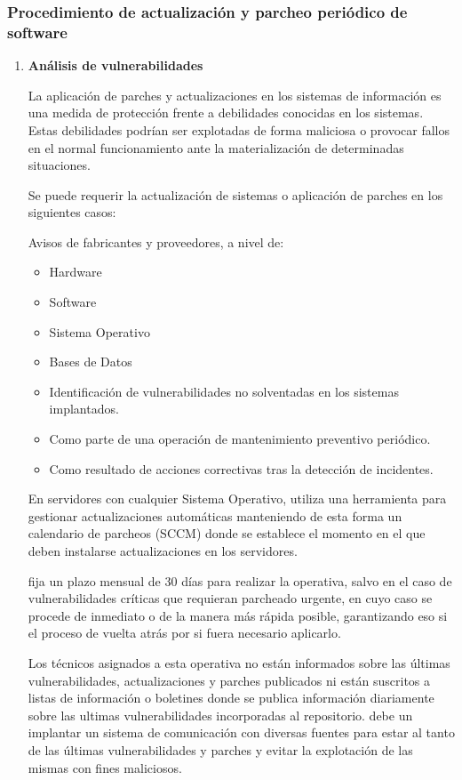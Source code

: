 
\subsubsection{Procedimiento de actualización y parcheo periódico de software}

\begin{enumerate}[label=\alph*)]

\item \textbf{Análisis de vulnerabilidades}

La aplicación de parches y actualizaciones en los sistemas de información es una medida de protección frente a debilidades conocidas en los sistemas. Estas debilidades podrían ser explotadas de forma maliciosa o provocar fallos en el normal funcionamiento ante la materialización de determinadas situaciones.

Se puede requerir la actualización de sistemas o aplicación de parches en los siguientes casos:

Avisos de fabricantes y proveedores, a nivel de:
\begin{itemize}
    \item Hardware
    \item Software
    \item Sistema Operativo
    \item Bases de Datos
    \item Identificación de vulnerabilidades no solventadas en los sistemas implantados.
    \item Como parte de una operación de mantenimiento preventivo periódico.
    \item Como resultado de acciones correctivas tras la detección de incidentes.
\end{itemize}

En servidores con cualquier Sistema Operativo, \Beneficiario{} utiliza una herramienta para gestionar actualizaciones automáticas manteniendo de esta forma un calendario de parcheos (SCCM) donde se establece el momento en el que deben instalarse actualizaciones en los servidores.

\Beneficiario{} fija un plazo mensual de 30 días para realizar la operativa, salvo en el caso de vulnerabilidades críticas que requieran parcheado urgente, en cuyo caso se procede de inmediato o de la manera más rápida posible, garantizando eso si el proceso de vuelta atrás por si fuera necesario aplicarlo.

Los técnicos asignados a esta operativa no están informados sobre las últimas vulnerabilidades, actualizaciones y parches publicados ni están suscritos a listas de información o boletines donde se publica información diariamente sobre las ultimas vulnerabilidades incorporadas al repositorio. \Beneficiario{} debe un implantar un sistema de comunicación con diversas fuentes para estar al tanto de las últimas vulnerabilidades y parches y evitar la explotación de las mismas con fines maliciosos.


\end{enumerate}
